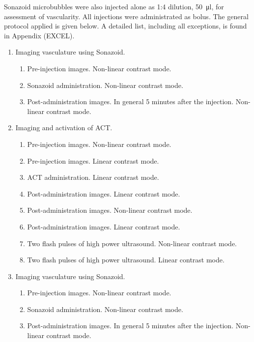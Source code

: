 Sonazoid\texttrademark{} microbubbles were also injected alone as 1:4 dilution, \SI{50}{\micro\litre}, for assessment of vascularity. All injections were administrated as bolus. The general protocol applied is given below\cite{Healey2014}. A detailed list, including all exceptions, is found in Appendix (EXCEL).
\FloatBarrier
\begin{enumerate}
	\item Imaging vasculature using Sonazoid\texttrademark{}.
		\begin{enumerate}
		\item Pre-injection images. Non-linear contrast mode.
		\item Sonazoid\texttrademark{} administration. Non-linear contrast mode.
		\item Post-administration images. In general 5 minutes after the injection. Non-linear contrast mode.
		\end{enumerate}
	\item Imaging and activation of ACT\texttrademark{}.
		\begin{enumerate}
		\item Pre-injection images. Non-linear contrast mode.
		\item Pre-injection images. Linear contrast mode.
		\item ACT\texttrademark{} administration. Linear contrast mode.
		\item Post-administration images. Linear contrast mode.
		\item Post-administration images. Non-linear contrast mode.
		\item Post-administration images. Linear contrast mode.
		\item Two flash pulses of high power ultrasound. Non-linear contrast mode.
		\item Two flash pulses of high power ultrasound. Linear contrast mode.
		\end{enumerate}
	\item Imaging vasculature using Sonazoid\texttrademark{}.
		\begin{enumerate}
		\item Pre-injection images. Non-linear contrast mode.
		\item Sonazoid\texttrademark{} administration. Non-linear contrast mode.
		\item Post-administration images. In general 5 minutes after the injection. Non-linear contrast mode.
		\end{enumerate}
\end{enumerate}  
 


